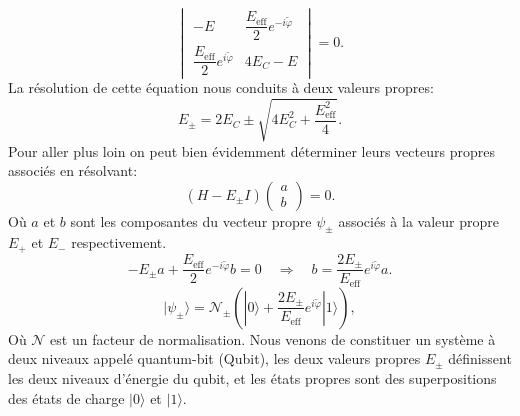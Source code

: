 \begin{equation}
\begin{vmatrix}
-E & \dfrac{E_{\mathrm{eff}}}{2} e^{-i\tilde{\varphi}} \\
\dfrac{E_{\mathrm{eff}}}{2} e^{i\tilde{\varphi}} & 4E_C - E
\end{vmatrix}
= 0.
\end{equation}
La résolution de cette équation nous conduits à deux valeurs propres:
\begin{equation}
E_{\pm}
= 2E_C \pm \sqrt{4E_C^2 + \frac{E_{\mathrm{eff}}^2}{4}}.
\end{equation}
Pour aller plus loin on peut bien évidemment déterminer leurs vecteurs propres associés en résolvant:
\begin{equation}
(H - E_\pm I)
\begin{pmatrix}
a \\ b
\end{pmatrix}
= 0.
\end{equation}
Où $a$ et $b$ sont les composantes du  vecteur propre $\psi_{\pm}$ associés à la valeur propre $E_+$ et $E_-$ respectivement.
\begin{equation}
- E_\pm a + \frac{E_{\mathrm{eff}}}{2} e^{-i\tilde{\varphi}} b = 0
\quad \Rightarrow \quad
b = \frac{2E_\pm}{E_{\mathrm{eff}}} e^{i\tilde{\varphi}} a.
\end{equation}
\begin{equation}
|\psi_\pm\rangle
= \mathcal{N}_\pm
\left(
|0\rangle
+ \frac{2E_\pm}{E_{\mathrm{eff}}} e^{i\tilde{\varphi}} |1\rangle
\right),
\end{equation}
Où $\mathcal{N}$ est un facteur de normalisation. Nous venons de constituer un système à deux niveaux appelé quantum-bit (Qubit), les deux valeurs propres $E_\pm$ définissent les deux niveaux d’énergie
du qubit, et les états propres sont des superpositions des états de charge
$|0\rangle$ et $|1\rangle$. %